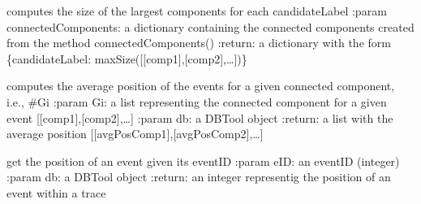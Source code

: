 \documentclass[letterpaper,10pt,english]{sphinxmanual}
\begin{document}

\begin{fulllineitems}
\label{\detokenize{refinement:refinement.labelRefinement.sizelargestComponent}}
computes the size of the largest components for each candidateLabel
:param connectedComponents: a dictionary containing the connected components created from the method connectedComponents()
:return: a dictionary with the form \{candidateLabel: maxSize({[}{[}comp1{]},{[}comp2{]},…{]})\}

\end{fulllineitems}


\begin{fulllineitems}
\label{\detokenize{refinement:refinement.labelRefinement.averagePosition}}
computes the average position of the events for a given connected component, i.e., \#Gi
:param Gi: a list representing the connected component for a given event {[}{[}comp1{]},{[}comp2{]},…{]}
:param db: a DBTool object
:return: a list with the average position {[}{[}avgPosComp1{]},{[}avgPosComp2{]},…{]}

\end{fulllineitems}


\begin{fulllineitems}
\label{\detokenize{refinement:refinement.labelRefinement.getPosition}}
get the position of an event given its eventID
:param eID: an eventID (integer)
:param db: a DBTool object
:return: an integer representig the position of an event within a trace

\end{fulllineitems}
\end{document}
